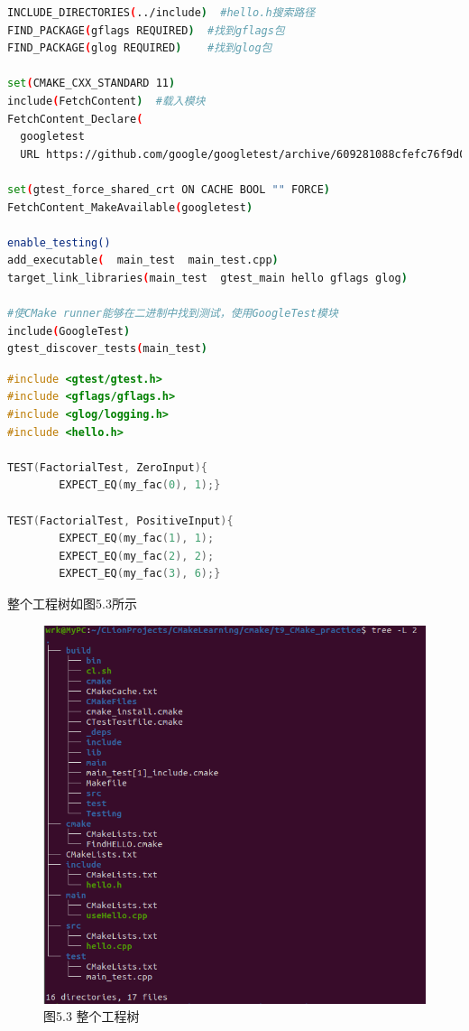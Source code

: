 \documentclass[40pt,a4paper，UTF8]{ctexart}
\begin{document}
\begin{lstlisting}[language=bash, caption=test/CMakeLists.txt]
INCLUDE_DIRECTORIES(../include)  #hello.h搜索路径
FIND_PACKAGE(gflags REQUIRED)  #找到gflags包
FIND_PACKAGE(glog REQUIRED)    #找到glog包

set(CMAKE_CXX_STANDARD 11)
include(FetchContent)  #载入模块
FetchContent_Declare(
  googletest
  URL https://github.com/google/googletest/archive/609281088cfefc76f9d0ce82e1ff6c30cc3591e5.zip)

set(gtest_force_shared_crt ON CACHE BOOL "" FORCE)
FetchContent_MakeAvailable(googletest)

enable_testing()
add_executable(  main_test  main_test.cpp)
target_link_libraries(main_test  gtest_main hello gflags glog)

#使CMake runner能够在二进制中找到测试，使用GoogleTest模块
include(GoogleTest)  
gtest_discover_tests(main_test) 
\end{lstlisting}

\begin{lstlisting}[language=C++, caption=test/main\_test.txt]
#include <gtest/gtest.h>
#include <gflags/gflags.h>
#include <glog/logging.h>
#include <hello.h>

TEST(FactorialTest, ZeroInput){
        EXPECT_EQ(my_fac(0), 1);}

TEST(FactorialTest, PositiveInput){
        EXPECT_EQ(my_fac(1), 1);
        EXPECT_EQ(my_fac(2), 2);
        EXPECT_EQ(my_fac(3), 6);}
\end{lstlisting}


整个工程树如图5.3所示
\begin{figure}[H]
\centering
\includegraphics[width=4.8in]{ch1_5_3.png} {图5.3 整个工程树}
\end{figure}
\end{document}
